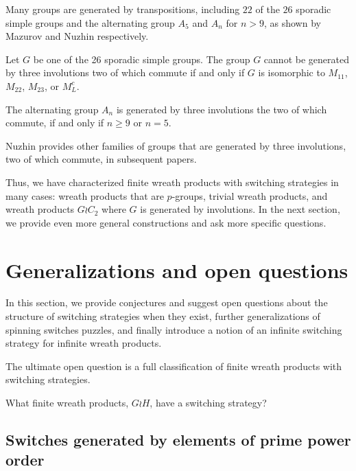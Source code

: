Many groups are generated by transpositions, including $22$ of the $26$
sporadic simple groups and the alternating group $A_5$ and $A_n$ for $n > 9$,
as shown by Mazurov and Nuzhin respectively.
\begin{theorem}\cite{Mazurov2003}
  Let $G$ be one of the 26 sporadic simple groups.
  The group $G$ cannot be generated by three involutions two of which commute
  if and only if $G$ is isomorphic to $M_{11}$, $M_{22}$, $M_{23}$, or $M^c_L$.
\end{theorem}
\begin{theorem}\cite{Nuzhin1992}
  The alternating group $A_n$ is generated by three involutions the
  two of which commute, if and only if $n \geq 9$ or $n = 5$.
\end{theorem}

Nuzhin provides other families of groups that are generated by three
involutions, two of which commute, in subsequent papers.
\cite{Nuzhin0,Nuzhin1,Nuzhin2}

Thus, we have characterized finite wreath products with switching strategies
in many cases:
wreath products that are $p$-groups,
trivial wreath products, and
wreath products $G \wr C_2$ where $G$ is generated by involutions.
In the next section, we provide even more general constructions and ask
more specific questions.

%
%
\section{Generalizations and open questions}
\label{sec:OpenQuestions}
In this section, we provide conjectures and suggest open questions about
the structure of switching strategies when they exist,
further generalizations of spinning switches puzzles,
and finally introduce a notion of an infinite switching strategy for infinite
wreath products.

The ultimate open question is a full classification
of finite wreath products with switching strategies.
\begin{openquestion}
  What finite wreath products, $G \wr H$, have a switching strategy?
\end{openquestion}
\subsection{Switches generated by elements of prime power order}

